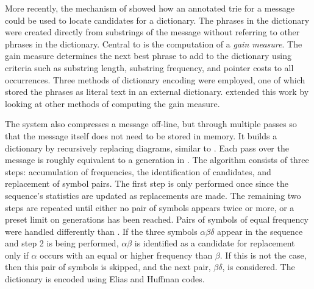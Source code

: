 More recently, the \offline mechanism of \citet{al00:procieee} 
showed how an annotated trie for a message could be used to
locate candidates for a dictionary.  The phrases in the
dictionary were created directly from substrings of the message
without referring to other phrases in the dictionary.
Central to \offline is the computation of a
{\emph {gain measure}}.  The gain measure determines
the next best phrase to add to the dictionary using criteria
such as substring length, substring frequency, and pointer costs 
to all occurrences.  Three methods of dictionary encoding
were employed, one of which stored the phrases as literal text
in an external dictionary.  \citet{ts02:acsc} extended this work
by looking at other methods of computing the gain measure.

The \ray system \citep{cw01:jasist} also compresses a message
off-line, but through multiple passes so that the message itself
does not need to be stored in memory.  It builds a dictionary by 
recursively replacing diagrams, similar to \repair.  Each pass 
over the message is roughly equivalent to a generation in 
\repair.  The \ray algorithm consists of three steps:  
accumulation of frequencies, the identification of candidates, 
and replacement of symbol pairs.  The first step is only 
performed once since the sequence's statistics are updated as 
replacements are made.  The remaining two steps are repeated 
until either no pair of symbols appears twice or more, or a preset 
limit on generations has been reached.  Pairs of symbols of 
equal frequency were handled differently than \repair.  If the 
three symbols ${\alpha}$${\beta}$${\delta}$ appear in the sequence 
and step 2 is being performed, ${\alpha}{\beta}$ is identified 
as a candidate for replacement only if ${\alpha}$ occurs with 
an equal or higher frequency than ${\beta}$.  If this is not 
the case, then this pair of symbols is skipped, and the 
next pair, ${\beta}{\delta}$, is considered.  The \ray dictionary
is encoded using Elias and Huffman codes.


